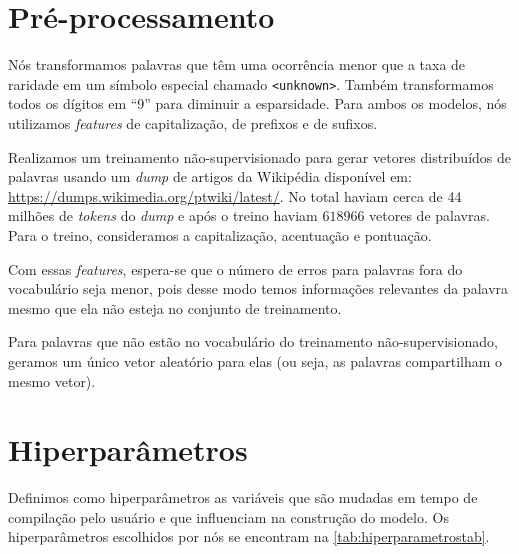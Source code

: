 \section{Pré-processamento}

Nós transformamos palavras que têm uma ocorrência menor que a taxa de raridade em um símbolo especial chamado \texttt{<unknown>}. Também transformamos todos os dígitos em ``9'' para diminuir a esparsidade. Para ambos os modelos, nós utilizamos \textit{features} de capitalização, de prefixos e de sufixos.

Realizamos um treinamento não-supervisionado para gerar vetores distribuídos de palavras usando um \textit{dump} de artigos da Wikipédia disponível em: \url{https://dumps.wikimedia.org/ptwiki/latest/}. No total haviam cerca de 44 milhões de \textit{tokens} do \textit{dump} e após o treino haviam $618966$ vetores de palavras. Para o treino, consideramos a capitalização, acentuação e pontuação.

Com essas \textit{features}, espera-se que o número de erros para palavras fora do vocabulário seja menor, pois desse modo temos informações relevantes da palavra mesmo que ela não esteja no conjunto de treinamento. 

Para palavras que não estão no vocabulário do treinamento não-supervisionado, geramos um único vetor aleatório para elas (ou seja, as palavras compartilham o mesmo vetor).


\section{Hiperparâmetros}

Definimos como hiperparâmetros as variáveis que são mudadas em tempo de compilação pelo usuário e que influenciam na construção do modelo. Os hiperparâmetros escolhidos por nós se encontram na \autoref{tab:hiperparametrostab}.


